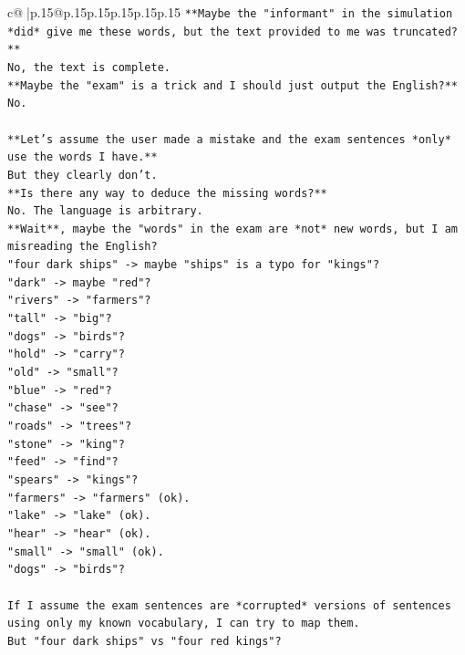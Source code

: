 \documentclass{article}
\begin{document}
{\begin{supertabular}{c@{$\;$}|p{.15\linewidth}@{}p{.15\linewidth}p{.15\linewidth}p{.15\linewidth}p{.15\linewidth}p{.15\linewidth}}
{{{\texttt{**Maybe the "informant" in the simulation *did* give me these words, but the text provided to me was truncated?**} \\
\texttt{No, the text is complete.} \\
\texttt{**Maybe the "exam" is a trick and I should just output the English?** No.} \\
\\ 
\texttt{**Let's assume the user made a mistake and the exam sentences *only* use the words I have.**} \\
\texttt{But they clearly don't.} \\
\texttt{**Is there any way to deduce the missing words?**} \\
\texttt{No. The language is arbitrary.} \\
\texttt{**Wait**, maybe the "words" in the exam are *not* new words, but I am misreading the English?} \\
\texttt{"four dark ships" {-}> maybe "ships" is a typo for "kings"?} \\
\texttt{"dark" {-}> maybe "red"?} \\
\texttt{"rivers" {-}> "farmers"?} \\
\texttt{"tall" {-}> "big"?} \\
\texttt{"dogs" {-}> "birds"?} \\
\texttt{"hold" {-}> "carry"?} \\
\texttt{"old" {-}> "small"?} \\
\texttt{"blue" {-}> "red"?} \\
\texttt{"chase" {-}> "see"?} \\
\texttt{"roads" {-}> "trees"?} \\
\texttt{"stone" {-}> "king"?} \\
\texttt{"feed" {-}> "find"?} \\
\texttt{"spears" {-}> "kings"?} \\
\texttt{"farmers" {-}> "farmers" (ok).} \\
\texttt{"lake" {-}> "lake" (ok).} \\
\texttt{"hear" {-}> "hear" (ok).} \\
\texttt{"small" {-}> "small" (ok).} \\
\texttt{"dogs" {-}> "birds"?} \\
\\ 
\texttt{If I assume the exam sentences are *corrupted* versions of sentences using only my known vocabulary, I can try to map them.} \\
\texttt{But "four dark ships" vs "four red kings"?} \\
}}}
\end{supertabular}}
\end{document}
